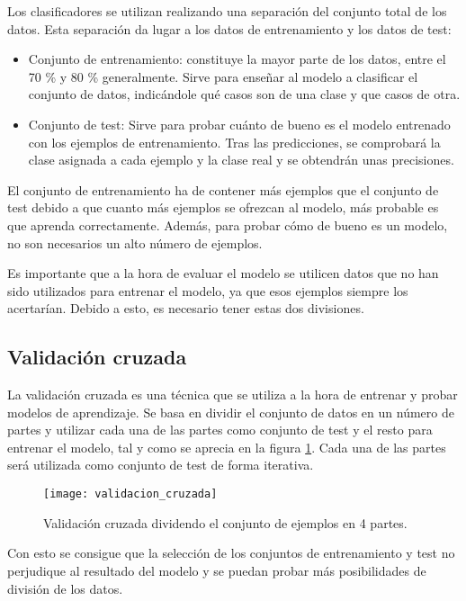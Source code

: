 Los clasificadores se utilizan realizando una separación del conjunto total de los datos. Esta separación da lugar a los datos de entrenamiento y los datos de test:

\begin{itemize}
	\item Conjunto de entrenamiento: constituye la mayor parte de los datos, entre el 70 \% y 80 \% generalmente. Sirve para enseñar al modelo a clasificar el conjunto de datos, indicándole qué casos son de una clase y que casos de otra.
	\item Conjunto de test: Sirve para probar cuánto de bueno es el modelo entrenado con los ejemplos de entrenamiento. Tras las predicciones, se comprobará la clase asignada a cada ejemplo y la clase real y se obtendrán unas precisiones.
\end{itemize}

El conjunto de entrenamiento ha de contener más ejemplos que el conjunto de test debido a que cuanto más ejemplos se ofrezcan al modelo, más probable es que aprenda correctamente. Además, para probar cómo de bueno es un modelo, no son necesarios un alto número de ejemplos.

Es importante que a la hora de evaluar el modelo se utilicen datos que no han sido utilizados para entrenar el modelo, ya que esos ejemplos siempre los acertarían. Debido a esto, es necesario tener estas dos divisiones.

\subsection{Validación cruzada}
La validación cruzada es una técnica que se utiliza a la hora de entrenar y probar modelos de aprendizaje. Se basa en dividir el conjunto de datos en un número de partes y utilizar cada una de las partes como conjunto de test y el resto para entrenar el modelo, tal y como se aprecia en la figura \ref{fig:valcruzada}. Cada una de las partes será utilizada como conjunto de test de forma iterativa.

\begin{figure}[h]
	\texttt{[image: validacion\_cruzada]}
	\caption[Validación cruzada dividendo el conjunto de ejemplos en 4 partes.]{Validación cruzada dividendo el conjunto de ejemplos en 4 partes.\cite{wiki:valcruzada}}
	\label{fig:valcruzada}
\end{figure}

Con esto se consigue que la selección de los conjuntos de entrenamiento y test no perjudique al resultado del modelo y se puedan probar más posibilidades de división de los datos.

